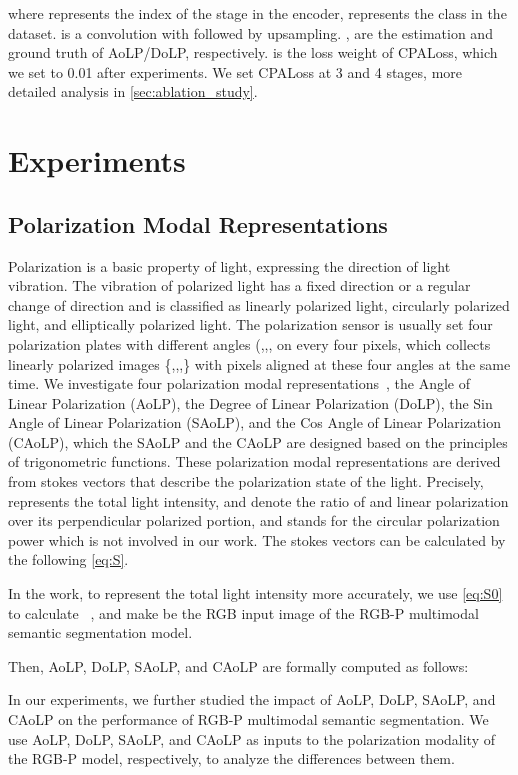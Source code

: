 \documentclass[10pt,twocolumn,letterpaper]{article}
\begin{document}
where  represents the index of the  stage in the encoder,  represents the class in the dataset.  is a convolution with  followed by upsampling. ,  are the estimation and ground truth of AoLP/DoLP, respectively.  is the loss weight of CPALoss, which we set to 0.01 after experiments. We set CPALoss at 3 and 4 stages, more detailed analysis in \cref{sec:ablation_study}. \section{Experiments}
\label{sec:experiments}


\subsection{Polarization Modal Representations}
\label{sec:pmodal_rep}


Polarization is a basic property of light, expressing the direction of light vibration. The vibration of polarized light has a fixed direction or a regular change of direction and is classified as linearly polarized light, circularly polarized light, and elliptically polarized light. The polarization sensor is usually set four polarization plates with different angles (,,, on every four pixels, which collects linearly polarized images \{,,,\} with pixels aligned at these four angles at the same time. We investigate four polarization modal representations~\cite{zju,5}, the Angle of Linear Polarization (AoLP), the Degree of Linear Polarization (DoLP), the Sin Angle of Linear Polarization (SAoLP), and the Cos Angle of Linear Polarization (CAoLP), which the SAoLP and the CAoLP are designed based on the principles of trigonometric functions. These polarization modal representations are derived from stokes vectors  that describe the polarization state of the light. Precisely,  represents the total light intensity,  and  denote the ratio of  and  linear polarization over its perpendicular polarized portion, and  stands for the circular polarization power which is not involved in our work. The stokes vectors  can be calculated by the following \cref{eq:S}.

In the work, to represent the total light intensity more accurately, we use \cref{eq:S0} to calculate ~\cite{48,5}, and make  be the RGB input image of the RGB-P multimodal semantic segmentation model.

Then, AoLP, DoLP, SAoLP, and CAoLP are formally computed as follows:

In our experiments, we further studied the impact of AoLP, DoLP, SAoLP, and CAoLP on the performance of RGB-P multimodal semantic segmentation. We use AoLP, DoLP, SAoLP, and CAoLP as inputs to the polarization modality of the RGB-P model, respectively, to analyze the differences between them.
\end{document}
